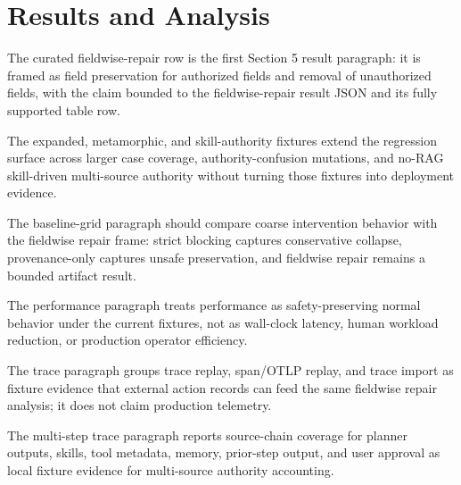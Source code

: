 \documentclass[11pt]{article}
\begin{document}
\section{Results and Analysis}

The curated fieldwise-repair row is the first Section 5 result paragraph: it is framed as field preservation for authorized fields and removal of unauthorized fields, with the claim bounded to the fieldwise-repair result JSON and its fully supported table row.

The expanded, metamorphic, and skill-authority fixtures extend the regression surface across larger case coverage, authority-confusion mutations, and no-RAG skill-driven multi-source authority without turning those fixtures into deployment evidence.

The baseline-grid paragraph should compare coarse intervention behavior with the fieldwise repair frame: strict blocking captures conservative collapse, provenance-only captures unsafe preservation, and fieldwise repair remains a bounded artifact result.

The performance paragraph treats performance as safety-preserving normal behavior under the current fixtures, not as wall-clock latency, human workload reduction, or production operator efficiency.

The trace paragraph groups trace replay, span/OTLP replay, and trace import as fixture evidence that external action records can feed the same fieldwise repair analysis; it does not claim production telemetry.

The multi-step trace paragraph reports source-chain coverage for planner outputs, skills, tool metadata, memory, prior-step output, and user approval as local fixture evidence for multi-source authority accounting.
\end{document}
